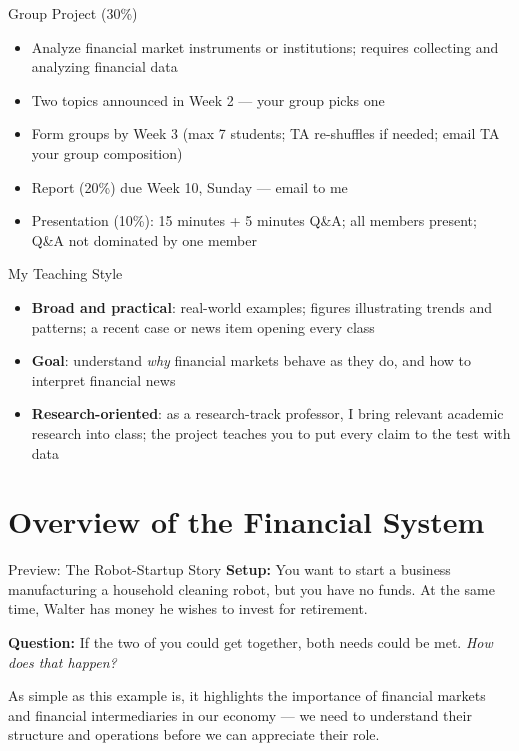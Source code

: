 \documentclass[aspectratio=169]{beamer}
\begin{document}
\begin{frame}{Group Project (30\%)}
\begin{itemize}
  \item Analyze financial market instruments or institutions; requires collecting and analyzing financial data
  \item Two topics announced in Week 2 --- your group picks one
  \item Form groups by Week 3 (max 7 students; TA re-shuffles if needed; email TA your group composition)
  \item Report (20\%) due Week 10, Sunday --- email to me
  \item Presentation (10\%): 15 minutes + 5 minutes Q\&A; all members present; Q\&A not dominated by one member
\end{itemize}
\end{frame}

\begin{frame}{My Teaching Style}
\begin{itemize}
  \item \textbf{Broad and practical}: real-world examples; figures illustrating trends and patterns; a recent case or news item opening every class
  \item \textbf{Goal}: understand \emph{why} financial markets behave as they do, and how to interpret financial news
  \item \textbf{Research-oriented}: as a research-track professor, I bring relevant academic research into class; the project teaches you to put every claim to the test with data
\end{itemize}
\end{frame}


\section{Overview of the Financial System}

\begin{frame}{Preview: The Robot-Startup Story}
\textbf{Setup:} You want to start a business manufacturing a household cleaning robot, but you have no funds. At the same time, Walter has money he wishes to invest for retirement.
\vspace{0.6em}

\textbf{Question:} If the two of you could get together, both needs could be met. \emph{How does that happen?}
\vspace{0.6em}

As simple as this example is, it highlights the importance of financial markets and financial intermediaries in our economy --- we need to understand their structure and operations before we can appreciate their role.
\end{frame}
\end{document}
